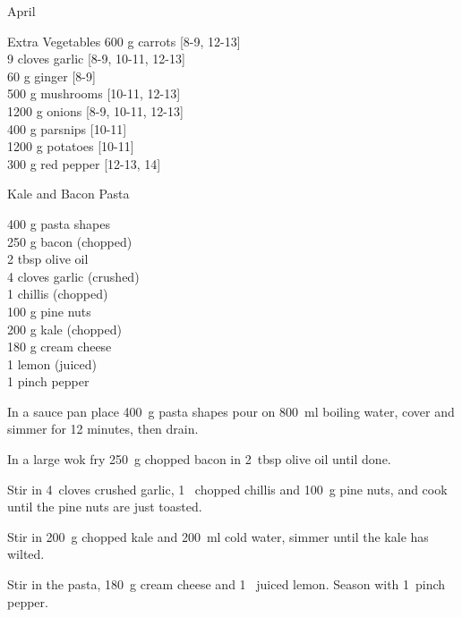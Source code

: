 \begin{menu}{April}
      \begin{shoppinglist}{Extra Vegetables}
      600 g carrots {\scriptsize[8-9, 12-13]}\\
      9 cloves garlic {\scriptsize[8-9, 10-11, 12-13]}\\
      60 g ginger {\scriptsize[8-9]}\\
      500 g mushrooms {\scriptsize[10-11, 12-13]}\\
      1200 g onions {\scriptsize[8-9, 10-11, 12-13]}\\
      400 g parsnips {\scriptsize[10-11]}\\
      1200 g potatoes {\scriptsize[10-11]}\\
      300 g red pepper {\scriptsize[12-13, 14]}\\
      \end{shoppinglist}%
      \par\vfil %
    \vfil\clearpage
  
    \begin{recipe}{2}{Kale and Bacon Pasta}%
		\begin{ingredients}
		400 g pasta shapes  \\
	250 g bacon (chopped) \\
	2 tbsp olive oil  \\
	4 cloves garlic (crushed) \\
	1  chillis (chopped) \\
	100 g pine nuts  \\
	200 g kale (chopped) \\
	180 g cream cheese  \\
	1  lemon (juiced) \\
	1 pinch pepper  \\
	
		\end{ingredients}
	
    \begin{instructions}
    \item 
      In a
      sauce pan
      place
      400~g  pasta shapes
      pour on
      800~ml  boiling water,
      cover and simmer for 12 minutes, then drain.
    \item 
        In a large wok fry
        250~g chopped bacon
        in
        2~tbsp  olive oil
        until done.
      \item 
        Stir in
        4~cloves crushed garlic,
        1~ chopped chillis
        and
        100~g  pine nuts,
        and cook until the pine nuts are just toasted.
      \item 
        Stir in
        200~g chopped kale
        and
        200~ml  cold water,
        simmer until the kale has wilted.
      \item 
        Stir in the pasta,
        180~g  cream cheese
        and
        1~ juiced lemon.
        Season with
        1~pinch  pepper.
      

\end{instructions}
\end{recipe}
\end{menu}
